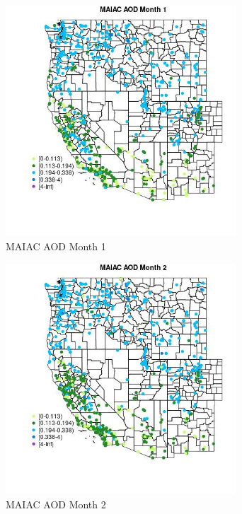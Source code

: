 \begin{figure} 
\centering  
\includegraphics[width=0.77\textwidth]{Code_Outputs/Report_ML_input_PM25_Step4_part_f_de_duplicated_aves_prioritize_24hr_obswNAs_MapObsMo1MAIAC_AOD.jpg} 
\caption{\label{fig:Report_ML_input_PM25_Step4_part_f_de_duplicated_aves_prioritize_24hr_obswNAsMapObsMo1MAIAC_AOD}MAIAC AOD Month 1} 
\end{figure} 
 

\clearpage 

\begin{figure} 
\centering  
\includegraphics[width=0.77\textwidth]{Code_Outputs/Report_ML_input_PM25_Step4_part_f_de_duplicated_aves_prioritize_24hr_obswNAs_MapObsMo2MAIAC_AOD.jpg} 
\caption{\label{fig:Report_ML_input_PM25_Step4_part_f_de_duplicated_aves_prioritize_24hr_obswNAsMapObsMo2MAIAC_AOD}MAIAC AOD Month 2} 
\end{figure} 
 

